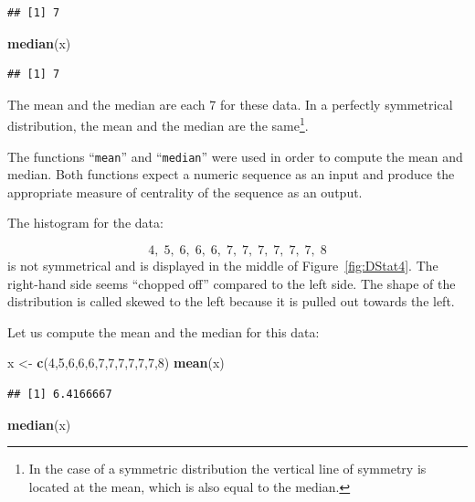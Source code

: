 \documentclass[]{krantz}
\makeatletter
\newenvironment{Shaded}{\begin{snugshade}}{\end{snugshade}}
\newcommand{\KeywordTok}[1]{\textcolor[rgb]{0.13,0.29,0.53}{\textbf{#1}}}
\newcommand{\DecValTok}[1]{\textcolor[rgb]{0.00,0.00,0.81}{#1}}
\newcommand{\StringTok}[1]{\textcolor[rgb]{0.31,0.60,0.02}{#1}}
\newcommand{\NormalTok}[1]{#1}
\newenvironment{kframe}{%
\medskip{}
\setlength{\fboxsep}{.8em}
 \def\at@end@of@kframe{}%
 \ifinner\ifhmode%
  \def\at@end@of@kframe{\end{minipage}}%
  \begin{minipage}{\columnwidth}%
 \fi\fi%
 \def\FrameCommand##1{\hskip\@totalleftmargin \hskip-\fboxsep
 \colorbox{shadecolor}{##1}\hskip-\fboxsep
     \hskip-\linewidth \hskip-\@totalleftmargin \hskip\columnwidth}%
 \MakeFramed {\advance\hsize-\width
   \@totalleftmargin\z@ \linewidth\hsize
   \@setminipage}}%
 {\par\unskip\endMakeFramed%
 \at@end@of@kframe}
\renewenvironment{Shaded}{\begin{kframe}}{\end{kframe}}
\theoremstyle{definition}
\theoremstyle{definition}
\theoremstyle{definition}
\theoremstyle{remark}
\makeatother
\begin{document}
\begin{verbatim}
## [1] 7
\end{verbatim}

\begin{Shaded}
\begin{Highlighting}[]
\KeywordTok{median}\NormalTok{(x)}
\end{Highlighting}
\end{Shaded}

\begin{verbatim}
## [1] 7
\end{verbatim}

The mean and the median are each 7 for these data. In a perfectly
symmetrical distribution, the mean and the median are the same\footnote{In
  the case of a symmetric distribution the vertical line of symmetry is
  located at the mean, which is also equal to the median.}.

The functions ``\texttt{mean}'' and ``\texttt{median}'' were used in
order to compute the mean and median. Both functions expect a numeric
sequence as an input and produce the appropriate measure of centrality
of the sequence as an output.

The histogram for the data:

\[4,\;  5,\;  6,\;  6,\;  6,\;  7,\;  7,\;  7,\;  7,\;  7,\;  7,\;  8\]
is not symmetrical and is displayed in the middle of
Figure~\ref{fig:DStat4}. The right-hand side seems ``chopped off''
compared to the left side. The shape of the distribution is called
skewed to the left because it is pulled out towards the left.

Let us compute the mean and the median for this data:

\begin{Shaded}
\begin{Highlighting}[]
\NormalTok{x <-}\StringTok{ }\KeywordTok{c}\NormalTok{(}\DecValTok{4}\NormalTok{,}\DecValTok{5}\NormalTok{,}\DecValTok{6}\NormalTok{,}\DecValTok{6}\NormalTok{,}\DecValTok{6}\NormalTok{,}\DecValTok{7}\NormalTok{,}\DecValTok{7}\NormalTok{,}\DecValTok{7}\NormalTok{,}\DecValTok{7}\NormalTok{,}\DecValTok{7}\NormalTok{,}\DecValTok{7}\NormalTok{,}\DecValTok{8}\NormalTok{)}
\KeywordTok{mean}\NormalTok{(x)}
\end{Highlighting}
\end{Shaded}

\begin{verbatim}
## [1] 6.4166667
\end{verbatim}

\begin{Shaded}
\begin{Highlighting}[]
\KeywordTok{median}\NormalTok{(x)}
\end{Highlighting}
\end{Shaded}
\end{document}
